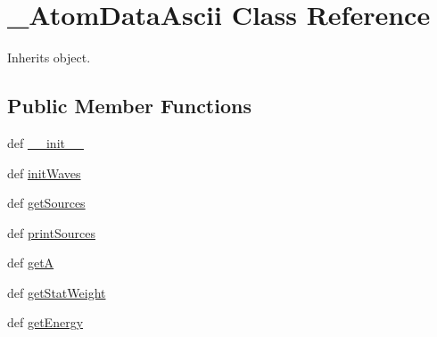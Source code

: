 \hypertarget{classpyneb_1_1core_1_1pynebcore_1_1___atom_data_ascii}{\section{\-\_\-\-Atom\-Data\-Ascii Class Reference}
\label{classpyneb_1_1core_1_1pynebcore_1_1___atom_data_ascii}
}


Inherits object.

\subsection*{Public Member Functions}
\begin{DoxyCompactItemize}
\item 
def \hyperlink{classpyneb_1_1core_1_1pynebcore_1_1___atom_data_ascii_ac775ee34451fdfa742b318538164070e}{\-\_\-\-\_\-init\-\_\-\-\_\-}
\item 
def \hyperlink{classpyneb_1_1core_1_1pynebcore_1_1___atom_data_ascii_a585a5ccbf1996b61e811632daf83d9a5}{init\-Waves}
\item 
def \hyperlink{classpyneb_1_1core_1_1pynebcore_1_1___atom_data_ascii_a13685d48c0180c5463a5dffebcd4fb29}{get\-Sources}
\item 
def \hyperlink{classpyneb_1_1core_1_1pynebcore_1_1___atom_data_ascii_a0120b7dbd5f911f8b1df2d2cebf6c09c}{print\-Sources}
\item 
def \hyperlink{classpyneb_1_1core_1_1pynebcore_1_1___atom_data_ascii_a17192519660871ef6a77e6bdad6f580d}{get\-A}
\item 
def \hyperlink{classpyneb_1_1core_1_1pynebcore_1_1___atom_data_ascii_a00fb8d8bc6381e46ebb1b76b2770442a}{get\-Stat\-Weight}
\item 
def \hyperlink{classpyneb_1_1core_1_1pynebcore_1_1___atom_data_ascii_a8406acc27904d955ee4dbb458f60db52}{get\-Energy}
\end{DoxyCompactItemize}
